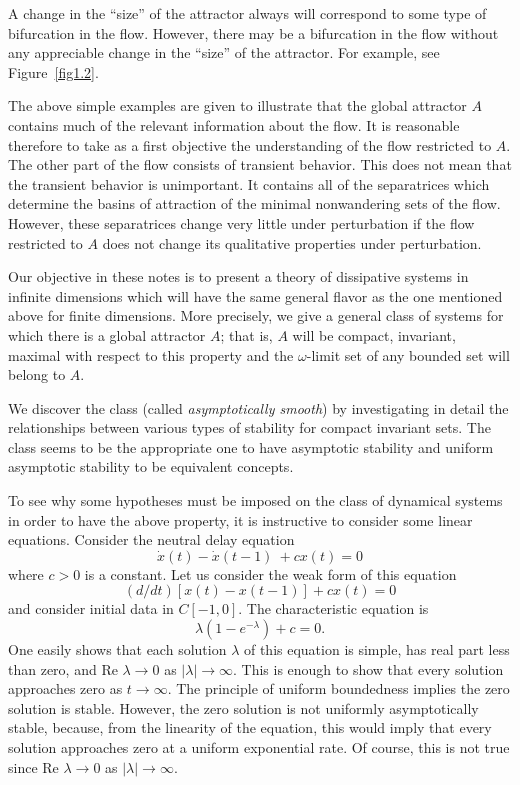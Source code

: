 \documentclass{surv-l}
\theoremstyle{plain}
\theoremstyle{definition}
\numberwithin{equation}{section}
\numberwithin{figure}{chapter}
\begin{document}
A change in the ``size'' of the attractor always will correspond to some type of bifurcation in the flow. However, there may be a bifurcation in the flow without any appreciable change in the ``size'' of the attractor. For example, see Figure~\ref{fig1.2}.

The above simple examples are given to illustrate that the global attractor $A$ contains much of the relevant information about the flow. It is reasonable therefore to take as a first objective the understanding of the flow restricted to $A$. The other part of the flow consists of transient behavior. This does not mean that the transient behavior is unimportant. It contains all of the separatrices which determine the basins of attraction of the minimal nonwandering sets of the flow. However, these separatrices change very little under perturbation if the flow restricted to $A$ does not change its qualitative properties under perturbation.

Our objective in these notes is to present a theory of dissipative systems in infinite dimensions which will have the same general flavor as the one mentioned above for finite dimensions. More precisely, we give a general class of systems for which there is a global attractor $A$; that is, $A$ will be compact, invariant, maximal with respect to this property and the $\omega$-limit set of any bounded set will belong to $A$.

We discover the class (called \emph{asymptotically smooth}) by investigating in detail the relationships between various types of stability for compact invariant sets. The class seems to be the appropriate one to have asymptotic stability and uniform asymptotic stability to be equivalent concepts.

To see why some hypotheses must be imposed on the class of dynamical systems in order to have the above property, it is instructive to consider some linear equations. Consider the neutral delay equation
\begin{equation*}
\dot{x}(t)-\dot{x}(t-1)\ +cx(t)=0
\end{equation*}
where $c>0$ is a constant. Let us consider the weak form of this equation
\begin{equation*}
(d/dt)[x(t)-x(t-1)]+cx(t)=0
\end{equation*}
and consider initial data in $C[-1,0]$. The characteristic equation is
\begin{equation*}
\lambda(1-e^{-\lambda})+c=0.
\end{equation*}
One easily shows that each solution $\lambda$ of this equation is simple, has real part less than zero, and Re $\lambda \rightarrow 0$ as $|\lambda|\rightarrow\infty$. This is enough to show that every solution approaches zero as $ t\rightarrow\infty$. The principle of uniform boundedness implies the zero solution is stable. However, the zero solution is not uniformly asymptotically stable, because, from the linearity of the equation, this would imply that every solution approaches zero at a uniform exponential rate. Of course, this is not true since Re $\lambda \rightarrow 0$ as $|\lambda|\rightarrow\infty$.
\end{document}

